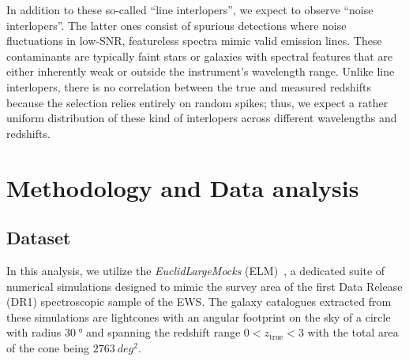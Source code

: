 \documentclass[12pt,a4paper,oneside]{report}
\begin{document}
In addition to these so-called “line interlopers”, we expect to observe “noise interlopers”. The latter ones consist of spurious detections where noise fluctuations in low-SNR, featureless spectra mimic valid emission lines. These contaminants are typically faint stars or galaxies with spectral features that are either inherently weak or outside the instrument's wavelength range. Unlike line interlopers, there is no correlation between the true and measured redshifts because the selection relies entirely on random spikes; thus, we expect a rather uniform distribution of these kind of interlopers across different wavelengths and redshifts.

\chapter{Methodology and Data analysis}\label{chap:MethodologyDataAnalysis}
\section{Dataset}\label{sec:Dataset}
In this analysis, we utilize the \textit{EuclidLargeMocks} (ELM)~\cite{ELM}, a dedicated suite of numerical simulations designed to mimic the survey area of the first Data Release (DR1) spectroscopic sample of the EWS. The galaxy catalogues extracted from these simulations are lightcones with an angular footprint on the sky of a circle with radius $\SI{30}{\degree}$ and spanning the redshift range $0 < z_\mathrm{true} < 3$ with the total area of the cone being $\SI{2763}{deg^2}$.
\end{document}
